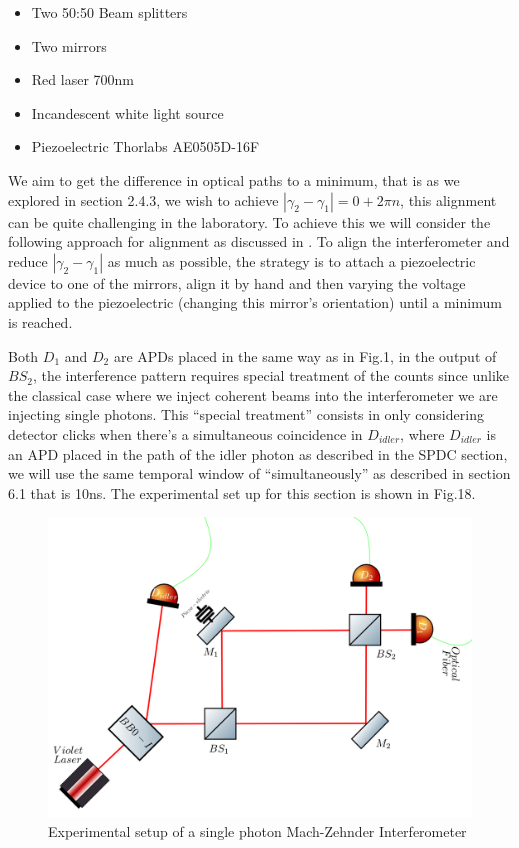 \documentclass[12pt]{book}
\begin{document}
\begin{itemize}
\item Two 50:50 Beam splitters
\item Two mirrors
\item Red laser 700nm
\item Incandescent white light source
\item Piezoelectric Thorlabs AE0505D-16F
\end{itemize}

We aim to get the difference in optical paths to a minimum, that is as we explored in section 2.4.3, we wish to achieve $|\gamma_{2}-\gamma_{1}|=0+2\pi n$, this alignment can be quite challenging in the laboratory. To achieve this we will consider the following approach for alignment as discussed in \cite{zuri}. To align the interferometer and reduce $|\gamma_{2}-\gamma_{1}|$ as much as possible, the strategy is to attach a piezoelectric device to one of the mirrors, align it by hand and then varying the voltage applied to the piezoelectric (changing this mirror's orientation) until a minimum is reached.

Both $D_{1}$ and $D_{2}$ are APDs placed in the same way as in Fig.1, in the output of  $BS_{2}$, the interference pattern requires special treatment of the counts since unlike the classical case where we inject coherent beams into the interferometer we are injecting single photons. This ``special treatment'' consists in only considering detector clicks when there's a simultaneous coincidence in $D_{idler}$, where $D_{idler}$ is an APD placed in the path of the idler photon as described in the SPDC section, we will use the same temporal window of ``simultaneously'' as described in section 6.1 that is 10ns. The experimental set up for this section is shown in Fig.18.


\begin{figure}[!htb]
\centering
\includegraphics[width=\linewidth]{images/machzehnder_single.png}
\caption{Experimental setup of a single photon Mach-Zehnder Interferometer}
\label{fig:BS2}
\end{figure}
\end{document}
